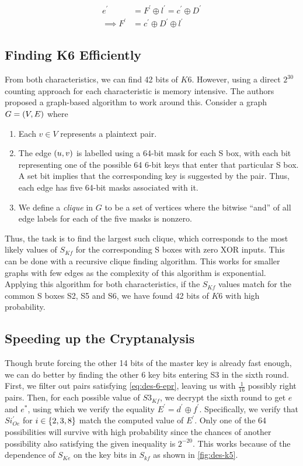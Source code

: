 \documentclass[twoside]{article}
\begin{document}
\begin{align}
    e^\prime &= F^\prime \oplus l^\prime = c^\prime \oplus D^\prime \\
    \implies F^\prime &= c^\prime \oplus D^\prime \oplus l^\prime
    \label{eq:des-6-epr}
\end{align}

\subsection{Finding K6 Efficiently}

From both characteristics, we can find 42 bits of \(K6\). However, using a 
direct \(2^{30}\) counting approach for each characteristic is memory
intensive. The authors proposed a graph-based algorithm to work around this.
Consider a graph \(G = (V, E)\) where

\begin{enumerate}
    \item Each \(v \in V\) represents a plaintext pair.
    \item The edge \((u, v)\) is labelled using a 64-bit mask for each S
    box, with each bit representing one of the possible 64 6-bit keys that enter
    that particular S box. A set bit implies that the corresponding key is
    suggested by the pair. Thus, each edge has five 64-bit masks associated with
    it.
    \item We define a \emph{clique} in \(G\) to be a set of vertices where the 
    bitwise ``and'' of all edge labels for each of the five masks is nonzero.
\end{enumerate}

Thus, the task is to find the largest such clique, which corresponds to the 
most likely values of \(S_{Kf}\) for the corresponding S boxes with zero XOR 
inputs. This can be done with a recursive clique finding algorithm. This works
for smaller graphs with few edges as the complexity of this algorithm is
exponential. Applying this algorithm for both characteristics, if the 
\(S_{Kf}\) values match for the common S boxes S2, S5 and S6, we have found
42 bits of \(K6\) with high probability.

\subsection{Speeding up the Cryptanalysis}

Though brute forcing the other 14 bits of the master key is already fast 
enough, we can do better by finding the other 6 key bits entering S3 in the 
sixth round. First, we filter out pairs satisfying \eqref{eq:des-6-epr}, 
leaving us with \(\frac{1}{16}\) possibly right pairs. Then, for each possible
value of \(S3_{Kf}\), we decrypt the sixth round to get \(e\) and \(e^*\),
using which we verify the equality \(E^\prime = d^\prime \oplus f^\prime\).
Specifically, we verify that \(Si^\prime_{Oe}\) for \(i \in \{2,3,8\}\)
match the computed value of \(E^\prime\). Only one of the 64 possibilities will
survive with high probability since the chances of another possibility also 
satisfying the given inequality is \(2^{-20}\). This works because of the 
dependence of \(S_{Ke}\) on the key bits in \(S_{kf}\) as shown in 
\autoref{fig:des-k5}.
\end{document}
